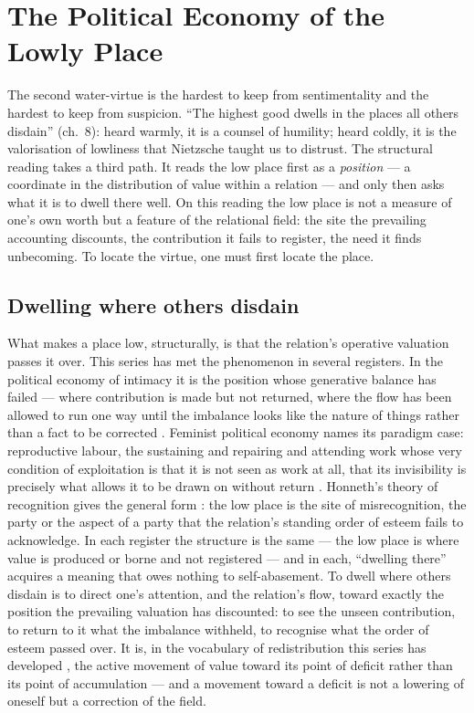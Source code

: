 \section{The Political Economy of the Lowly Place}
\label{p20:sec:lowliness}

\noindent
The second water-virtue is the hardest to keep from sentimentality and the hardest to keep from suspicion. ``The highest good dwells in the places all others disdain'' (ch.~8): heard warmly, it is a counsel of humility; heard coldly, it is the valorisation of lowliness that Nietzsche taught us to distrust. The structural reading takes a third path. It reads the low place first as a \emph{position} --- a coordinate in the distribution of value within a relation --- and only then asks what it is to dwell there well. On this reading the low place is not a measure of one's own worth but a feature of the relational field: the site the prevailing accounting discounts, the contribution it fails to register, the need it finds unbecoming. To locate the virtue, one must first locate the place.

\subsection{Dwelling where others disdain}
\label{p20:sub:low-disdain}

What makes a place low, structurally, is that the relation's operative valuation passes it over. This series has met the phenomenon in several registers. In the political economy of intimacy it is the position whose generative balance has failed --- where contribution is made but not returned, where the flow has been allowed to run one way until the imbalance looks like the nature of things rather than a fact to be corrected \parencite{paperxvii}. Feminist political economy names its paradigm case: reproductive labour, the sustaining and repairing and attending work whose very condition of exploitation is that it is not seen as work at all, that its invisibility is precisely what allows it to be drawn on without return \parencite{federici2004}. Honneth's theory of recognition gives the general form \parencite{honneth1995}: the low place is the site of misrecognition, the party or the aspect of a party that the relation's standing order of esteem fails to acknowledge. In each register the structure is the same --- the low place is where value is produced or borne and not registered --- and in each, ``dwelling there'' acquires a meaning that owes nothing to self-abasement. To dwell where others disdain is to direct one's attention, and the relation's flow, toward exactly the position the prevailing valuation has discounted: to see the unseen contribution, to return to it what the imbalance withheld, to recognise what the order of esteem passed over. It is, in the vocabulary of redistribution this series has developed \parencite{paperxv}, the active movement of value toward its point of deficit rather than its point of accumulation --- and a movement toward a deficit is not a lowering of oneself but a correction of the field.

